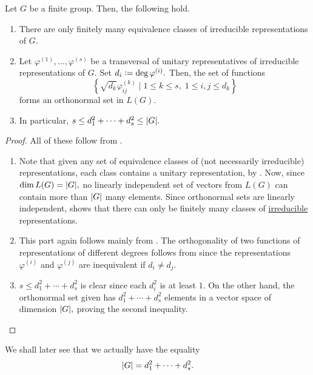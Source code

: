 \begin{prop} \label{prop:fingroupirredbounds}
	Let $G$ be a finite group. Then, the following hold.
	\begin{enumerate}
		\item There are only finitely many equivalence classes of irreducible representations of $G.$

		\item Let $\varphi^{(1)}, \ldots, \varphi^{(s)}$ be a transversal of unitary representatives of irreducible representations of $G.$ Set $d_i \vcentcolon= \deg \varphi^{(i)}.$ Then, the set of functions
		\begin{equation*} 
			\left\{\sqrt{d_k}\varphi_{ij}^{(k)} \mid 1 \le k \le s,\;1 \le i, j \le d_k\right\}
		\end{equation*}
		forms an orthonormal set in $L(G).$	
		\item In particular, $s \le d_1^2 + \cdots + d_s^2 \le {\left\lvert G \right\lvert}.$
	\end{enumerate}
\end{prop}
\begin{proof} All of these follow from .
	\begin{enumerate}
		\item Note that given any set of equivalence classes of (not necessarily irreducible) representations, each class contains a unitary representation, by . Now, since $\dim L(G) = {\left\lvert G \right\lvert},$ no linearly independent set of vectors from $L(G)$ can contain more than ${\left\lvert G \right\lvert}$ many elements. Since orthonormal sets are linearly independent,  shows that there can only be finitely many classes of \underline{irreducible} representations.
		\item This part again follows mainly from . The orthogonality of two functions of representations of different degrees follows from  since the representations $\varphi^{(i)}$ and $\varphi^{(j)}$ are inequivalent if $d_i \neq d_j.$
		\item $s \le d_1^2 + \cdots + d_s^2$ is clear since each $d_i^2$ is at least $1.$ On the other hand, the orthonormal set given has $d_1^2 + \cdots + d_s^2$ elements in a vector space of dimension ${\left\lvert G \right\lvert},$ proving the second inequality. \qedhere
	\end{enumerate}
\end{proof}

\begin{rem}
	We shall later see that we actually have the equality 
	\begin{equation*} 
		{\left\lvert G \right\lvert} = d_1^2 + \cdots + d_s^2.
	\end{equation*}
\end{rem}

